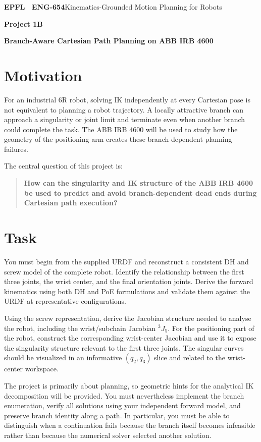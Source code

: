 \documentclass[11pt,a4paper]{article}
\begin{document}
{\small\textbf{EPFL \textbar\ ENG-654}\hfill Kinematics-Grounded Motion Planning for Robots}
\vspace{5mm}

{\color{epflred}\Large\bfseries Project 1B}

{\LARGE\bfseries Branch-Aware Cartesian Path Planning on ABB IRB 4600\par}

\section*{Motivation}
For an industrial 6R robot, solving IK independently at every Cartesian pose is not equivalent to planning a robot trajectory. A locally attractive branch can approach a singularity or joint limit and terminate even when another branch could complete the task. The ABB IRB 4600 will be used to study how the geometry of the positioning arm creates these branch-dependent planning failures.

The central question of this project is:

\begin{quote}
\textbf{How can the singularity and IK structure of the ABB IRB 4600 be used to predict and avoid branch-dependent dead ends during Cartesian path execution?}
\end{quote}

\section*{Task}
You must begin from the supplied URDF and reconstruct a consistent DH and screw model of the complete robot. Identify the relationship between the first three joints, the wrist center, and the final orientation joints. Derive the forward kinematics using both DH and PoE formulations and validate them against the URDF at representative configurations.

Using the screw representation, derive the Jacobian structure needed to analyse the robot, including the wrist/subchain Jacobian $^{3}J_{5}$. For the positioning part of the robot, construct the corresponding wrist-center Jacobian and use it to expose the singularity structure relevant to the first three joints. The singular curves should be visualized in an informative $(q_2,q_3)$ slice and related to the wrist-center workspace.

The project is primarily about planning, so geometric hints for the analytical IK decomposition will be provided. You must nevertheless implement the branch enumeration, verify all solutions using your independent forward model, and preserve branch identity along a path. In particular, you must be able to distinguish when a continuation fails because the branch itself becomes infeasible rather than because the numerical solver selected another solution.
\end{document}

